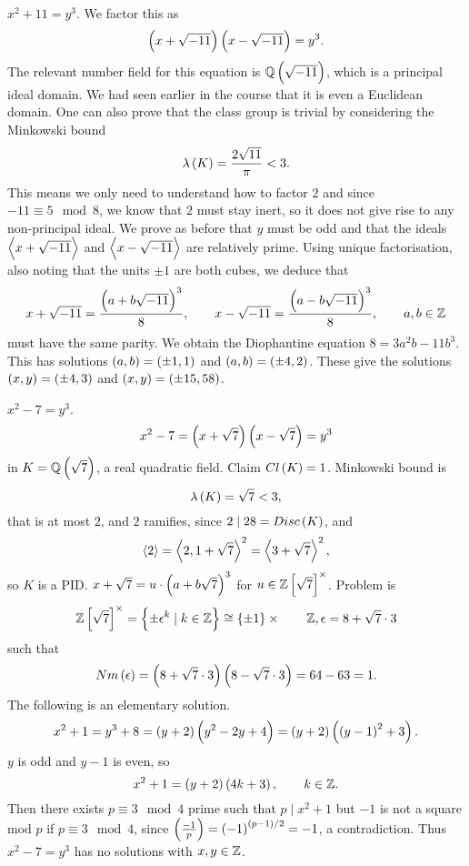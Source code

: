 \pagebreak

\begin{example*}
$ x^2 + 11 = y^3 $. We factor this as
$$ \br{x + \sqrt{-11}}\br{x - \sqrt{-11}} = y^3. $$
The relevant number field for this equation is $ \Q\br{\sqrt{-11}} $, which is a principal ideal domain. We had seen earlier in the course that it is even a Euclidean domain. One can also prove that the class group is trivial by considering the Minkowski bound
$$ \lambda\br{K} = \dfrac{2\sqrt{11}}{\pi} < 3. $$
This means we only need to understand how to factor $ 2 $ and since $ -11 \equiv 5 \mod 8 $, we know that $ 2 $ must stay inert, so it does not give rise to any non-principal ideal. We prove as before that $ y $ must be odd and that the ideals $ \left\langle x + \sqrt{-11} \right\rangle $ and $ \left\langle x - \sqrt{-11} \right\rangle $ are relatively prime. Using unique factorisation, also noting that the units $ \pm 1 $ are both cubes, we deduce that
$$ x + \sqrt{-11} = \dfrac{\br{a + b\sqrt{-11}}^3}{8}, \qquad x - \sqrt{-11} = \dfrac{\br{a - b\sqrt{-11}}^3}{8}, \qquad a, b \in \Z $$
must have the same parity. We obtain the Diophantine equation $ 8 = 3a^2b - 11b^3 $. This has solutions $ \br{a, b} = \br{\pm 1, 1} $ and $ \br{a, b} = \br{\pm 4, 2} $. These give the solutions $ \br{x, y} = \br{\pm 4, 3} $ and $ \br{x, y} = \br{\pm 15, 58} $.
\end{example*}

\begin{example*}
$ x^2 - 7 = y^3 $.
$$ x^2 - 7 = \br{x + \sqrt{7}}\br{x - \sqrt{7}} = y^3 $$
in $ K = \Q\br{\sqrt{7}} $, a real quadratic field. Claim $ Cl\br{K} = 1 $. Minkowski bound is
$$ \lambda\br{K} = \sqrt{7} < 3, $$
that is at most $ 2 $, and $ 2 $ ramifies, since $ 2 \mid 28 = Disc\br{K} $, and
$$ \left\langle 2 \right\rangle = \left\langle 2, 1 + \sqrt{7} \right\rangle^2 = \left\langle 3 + \sqrt{7} \right\rangle^2, $$
so $ K $ is a PID. $ x + \sqrt{7} = u \cdot \br{a + b\sqrt{7}}^3 $ for $ u \in \Z\sbr{\sqrt{7}}^\times $. Problem is
$$ \Z\sbr{\sqrt{7}}^\times = \cbr{\pm\epsilon^k \mid k \in \Z} \cong \cbr{\pm 1} \times \qquad \Z, \epsilon = 8 + \sqrt{7} \cdot 3 $$
such that
$$ Nm\br{\epsilon} = \br{8 + \sqrt{7} \cdot 3}\br{8 - \sqrt{7} \cdot 3} = 64 - 63 = 1. $$
The following is an elementary solution.
$$ x^2 + 1 = y^3 + 8 = \br{y + 2}\br{y^2 - 2y + 4} = \br{y + 2}\br{\br{y - 1}^2 + 3}. $$
$ y $ is odd and $ y - 1 $ is even, so
$$ x^2 + 1 = \br{y + 2}\br{4k + 3}, \qquad k \in \Z. $$
Then there exists $ p \equiv 3 \mod 4 $ prime such that $ p \mid x^2 + 1 $ but $ -1 $ is not a square mod $ p $ if $ p \equiv 3 \mod 4 $, since $ \jacobi{-1}{p} = \br{-1}^{\br{p - 1} / 2} = -1 $, a contradiction. Thus $ x^2 - 7 = y^3 $ has no solutions with $ x, y \in \mathbb{Z} $.
\end{example*}

